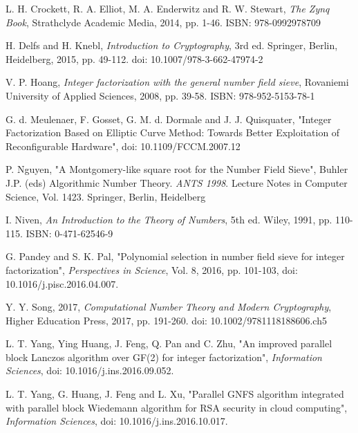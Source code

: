 \documentclass[conference]{IEEEtran}
\begin{document}
\begin{thebibliography}{00}

 L. H. Crockett, R. A. Elliot, M. A. Enderwitz and R. W. Stewart, \textit{The Zynq Book},
Strathclyde Academic Media, 2014, pp. 1-46.
ISBN: 978-0992978709

 H. Delfs and H. Knebl, \textit{Introduction to Cryptography}, 3rd ed. 
Springer, Berlin, Heidelberg, 2015, pp. 49-112.
doi: 10.1007/978-3-662-47974-2

 V. P. Hoang, \textit{Integer factorization with the general number field sieve},
Rovaniemi University of Applied Sciences, 2008, pp. 39-58.
ISBN: 978-952-5153-78-1

 G. d. Meulenaer, F. Gosset, G. M. d. Dormale and J. J. Quisquater, "Integer Factorization Based on Elliptic Curve Method: Towards Better Exploitation of Reconfigurable Hardware", %
doi: 10.1109/FCCM.2007.12

 P. Nguyen, "A Montgomery-like square root for the Number Field Sieve", Buhler J.P. (eds) Algorithmic Number Theory. \textit{ANTS 1998}. Lecture Notes in Computer Science, Vol. 1423. Springer, Berlin, Heidelberg

 I. Niven, \textit{An Introduction to the Theory of Numbers}, 5th ed.
Wiley, 1991, pp. 110-115.
ISBN: 0-471-62546-9

 G. Pandey and S. K. Pal, "Polynomial selection in number field sieve for integer factorization", \textit{Perspectives in Science}, Vol. 8, 2016, pp. 101-103, 
doi: 10.1016/j.pisc.2016.04.007.

 Y. Y. Song, 2017, \textit{Computational Number Theory and Modern Cryptography},
Higher Education Press, 2017, pp. 191-260.
doi: 10.1002/9781118188606.ch5

 L. T. Yang, Ying Huang, J. Feng, Q. Pan and C. Zhu, "An improved parallel block Lanczos algorithm over GF(2) for integer factorization", \textit{Information Sciences}, %
doi: 10.1016/j.ins.2016.09.052.

 L. T. Yang, G. Huang, J. Feng and L. Xu, "Parallel GNFS algorithm integrated with parallel block Wiedemann algorithm for RSA security in cloud computing", \textit{Information Sciences}, %
doi: 10.1016/j.ins.2016.10.017.



\end{thebibliography}
\end{document}
